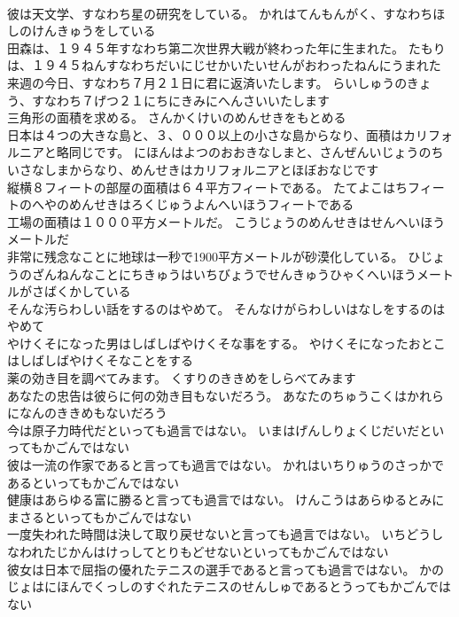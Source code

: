 \documentclass[8pt]{extreport}
\begin{document}
\begin{CJK}{UTF8}{min}
\\	彼は天文学、すなわち星の研究をしている。	かれはてんもんがく、すなわちほしのけんきゅうをしている 
\\	田森は、１９４５年すなわち第二次世界大戦が終わった年に生まれた。	たもりは、１９４５ねんすなわちだいにじせかいたいせんがおわったねんにうまれた 
\\	来週の今日、すなわち７月２１日に君に返済いたします。	らいしゅうのきょう、すなわち７げつ２１にちにきみにへんさいいたします 
\\	三角形の面積を求める。	さんかくけいのめんせきをもとめる 
\\	日本は４つの大きな島と、３、０００以上の小さな島からなり、面積はカリフォルニアと略同じです。	にほんはよつのおおきなしまと、さんぜんいじょうのちいさなしまからなり、めんせきはカリフォルニアとほぼおなじです 
\\	縦横８フィートの部屋の面積は６４平方フィートである。	たてよこはちフィートのへやのめんせきはろくじゅうよんへいほうフィートである 
\\	工場の面積は１０００平方メートルだ。	こうじょうのめんせきはせんへいほうメートルだ 
\\	非常に残念なことに地球は一秒で1900平方メートルが砂漠化している。	ひじょうのざんねんなことにちきゅうはいちびょうでせんきゅうひゃくへいほうメートルがさばくかしている 
\\	そんな汚らわしい話をするのはやめて。	そんなけがらわしいはなしをするのはやめて 
\\	やけくそになった男はしばしばやけくそな事をする。	やけくそになったおとこはしばしばやけくそなことをする 
\\	薬の効き目を調べてみます。	くすりのききめをしらべてみます 
\\	あなたの忠告は彼らに何の効き目もないだろう。	あなたのちゅうこくはかれらになんのききめもないだろう 
\\	今は原子力時代だといっても過言ではない。	いまはげんしりょくじだいだといってもかごんではない 
\\	彼は一流の作家であると言っても過言ではない。	かれはいちりゅうのさっかであるといってもかごんではない 
\\	健康はあらゆる富に勝ると言っても過言ではない。	けんこうはあらゆるとみにまさるといってもかごんではない 
\\	一度失われた時間は決して取り戻せないと言っても過言ではない。	いちどうしなわれたじかんはけっしてとりもどせないといってもかごんではない 
\\	彼女は日本で屈指の優れたテニスの選手であると言っても過言ではない。	かのじょはにほんでくっしのすぐれたテニスのせんしゅであるとうってもかごんではない 

\end{CJK}
\end{document}
